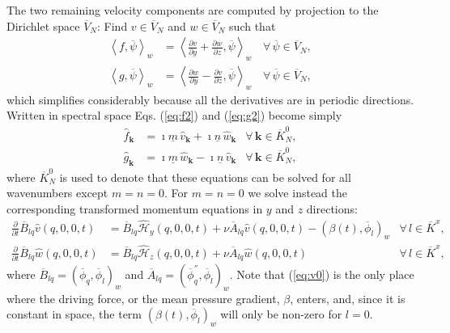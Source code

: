 \documentclass[11pt, oneside]{elsarticle}
\newcommand{\D}[1]{\overline{#1}}
\begin{document}
The two remaining velocity components are computed by projection to the 
Dirichlet space $\D{V}_N$: Find 
${v} \in \D{V}_N$ and $w \in \D{V}_N$ such that
\begin{align}
\left<f, \D{\psi}\right>_w &= \left<\frac{\partial v}{\partial y} + 
\frac{\partial w}{\partial z}, \D{\psi}\right>_w \, &\forall \, \D{\psi} \in 
\D{V}_N, \label{eq:f2} \\
\left<g, \D{\psi}\right>_w &= \left<\frac{\partial w}{\partial y}  - 
\frac{\partial v}{\partial z}, \D{\psi}\right>_w \, &\forall \, \D{\psi} \in 
\D{V}_N, \label{eq:g2}
\end{align}
which simplifies considerably because all the derivatives are in periodic 
directions. Written in spectral space Eqs. (\ref{eq:f2}) and (\ref{eq:g2}) 
become simply
\begin{align}
\hat{f}_{\bm{k}} &= \imath \underline{m}\, \hat{v}_{\bm{k}} + \imath 
\underline{n}\, \hat{w}_{\bm{k}} &\forall \, \bm{k} \in \D{K}_N^0, \label{eq:f3} \\
\hat{g}_{\bm{k}} &= \imath \underline{m}\, \hat{w}_{\bm{k}} - \imath 
\underline{n}\, \hat{v}_{\bm{k}} & \forall \, \bm{k} \in \D{K}_N^0, \label{eq:g3}
\end{align}
where $\D{K}_N^0$ is used to denote that these equations can be solved for all 
wavenumbers except $m=n=0$. For $m=n=0$ we solve instead the 
corresponding transformed momentum equations in $y$ and $z$ directions:
\begin{align}
\frac{\partial }{\partial t} \D{B}_{lq}\hat{v}(q, 0, 0, t) &= 
\D{B}_{lq}\hat{\mathcal{H}}_y(q, 0, 0, t) + \nu \D{A}_{lq} \hat{v}(q, 0, 0, t) - \left(\beta(t), \D{\phi}_l \right)_w
& \forall\, l \in \D{K}^x, \label{eq:v0}\\
\frac{\partial }{\partial t} \D{B}_{lq}\hat{w}(q, 0, 0, t) &= 
\D{B}_{lq}\hat{\mathcal{H}}_z(q, 0, 0, t) + \nu \D{A}_{lq} \hat{w}(q, 0, 0, t) 
& \forall\, l \in \D{K}^x,\label{eq:w0}
\end{align}
where $\D{B}_{lq} = \left(\D{\phi}_q, \D{\phi}_l \right)_w$ and $\D{A}_{lq}=\left(\D{\phi}_q^{''}, \D{\phi}_l \right)_w$. Note that (\ref{eq:v0}) is the only place where the driving force, or the mean pressure gradient, $\beta$, enters, and, since it is constant in space, the term $\left(\beta(t), \D{\phi}_l \right)_w$ will only be non-zero for $l=0$.
\end{document}
